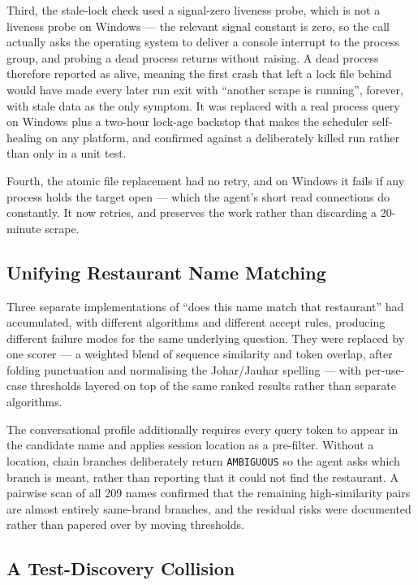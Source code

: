 \documentclass[11pt,a4paper]{article}
\newcommand{\code}[1]{\texttt{\small #1}}
\begin{document}
Third, the stale-lock check used a signal-zero liveness probe, which is not a
liveness probe on Windows --- the relevant signal constant is zero, so the call
actually asks the operating system to deliver a console interrupt to the
process group, and probing a dead process returns without raising. A dead
process therefore reported as alive, meaning the first crash that left a lock
file behind would have made every later run exit with ``another scrape is
running'', forever, with stale data as the only symptom. It was replaced with a
real process query on Windows plus a two-hour lock-age backstop that makes the
scheduler self-healing on any platform, and confirmed against a deliberately
killed run rather than only in a unit test.

Fourth, the atomic file replacement had no retry, and on Windows it fails if
any process holds the target open --- which the agent's short read connections
do constantly. It now retries, and preserves the work rather than discarding a
20-minute scrape.

\subsection{Unifying Restaurant Name Matching}

Three separate implementations of ``does this name match that restaurant'' had
accumulated, with different algorithms and different accept rules, producing
different failure modes for the same underlying question. They were replaced by
one scorer --- a weighted blend of sequence similarity and token overlap, after
folding punctuation and normalising the Johar/Jauhar spelling --- with
per-use-case thresholds layered on top of the same ranked results rather than
separate algorithms.

The conversational profile additionally requires every query token to appear in
the candidate name and applies session location as a pre-filter. Without a
location, chain branches deliberately return \code{AMBIGUOUS} so the agent asks
which branch is meant, rather than reporting that it could not find the
restaurant. A pairwise scan of all 209 names confirmed that the remaining
high-similarity pairs are almost entirely same-brand branches, and the residual
risks were documented rather than papered over by moving thresholds.

\subsection{A Test-Discovery Collision}
\end{document}
